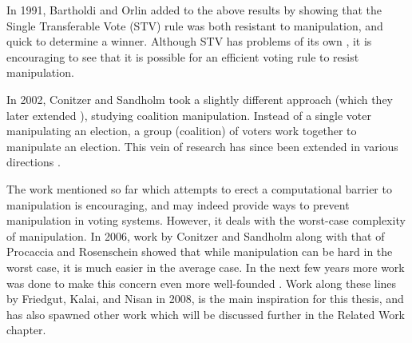 	In 1991, Bartholdi and Orlin \cite{bartholdi1991single} added to the above results by showing that the Single Transferable Vote (STV) rule was both resistant to manipulation, and quick to determine a winner. Although STV has problems of its own \cite{brams1982ams, doron1977single, fishburn1983paradoxes, holzman1989vote, moulin1988condorcet}, it is encouraging to see that it is possible for an efficient voting rule to resist manipulation.

	In 2002, Conitzer and Sandholm took a slightly different approach \cite{conitzer2002vote} (which they later extended \cite{conitzer2007elections}), studying coalition manipulation. Instead of a single voter manipulating an election, a group (coalition) of voters work together to manipulate an election. This vein of research has since been extended in various directions \cite{conitzer2003universal, elkind2005hybrid, faliszewski2006complexity, hemaspaandra2007anyone, procaccia2007multi, elkind2005small}.

	The work mentioned so far which attempts to erect a computational barrier to manipulation is encouraging, and may indeed provide ways to prevent manipulation in voting systems. However, it deals with the worst-case complexity of manipulation. In 2006, work by Conitzer and Sandholm \cite{conitzer2006nonexistence} along with that of Procaccia and Rosenschein \cite{procaccia2006junta} showed that while manipulation can be hard in the worst case, it is much easier in the average case. In the next few years more work was done to make this concern even more well-founded \cite{procaccia2007average, erdelyi2007approximating}. Work along these lines by Friedgut, Kalai, and Nisan \cite{friedgut2008elections} in 2008, is the main inspiration for this thesis, and has also spawned other work which will be discussed further in the Related Work chapter.
